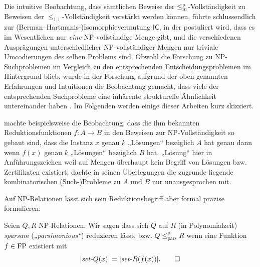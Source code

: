 Die intuitive Beobachtung, dass sämtlichen Beweise der $\leq_\mathrm{m}^\mathrm{p}$-Vollständigkeit zu Beweisen der $\leq_\mathrm{1,i}$-Vollständigkeit verstärkt werden können, führte schlussendlich zur (Berman--Hartmanis-\nolinebreak)\linebreak[1]Isomorphievermutung $\mathsf{IC}$, in der postuliert wird, dass es im Wesentlichen nur \emph{eine} NP-vollständige Menge gibt, und die verschiedenen Ausprägungen unterschiedlicher NP-vollständiger Mengen nur triviale Umcodierungen des selben Problems sind.
Obwohl die Forschung zu NP-Suchproblemen im Vergleich zu den entsprechenden Entscheidungsproblemen im Hintergrund blieb, wurde in der Forschung aufgrund der oben genannten Erfahrungen und Intuitionen die Beobachtung gemacht, dass viele der entsprechenden Suchprobleme eine inhärente strukturelle Ähnlichkeit untereinander haben \parencite[vgl. auch die Diskussion von][]{hemaspaandra_take-home_1998}.
Im Folgenden werden einige dieser Arbeiten kurz skizziert.

\textcite[83]{simon_central_1975} machte beispielsweise die Beobachtung, dass die ihm bekannten Reduktionsfunktionen $f\colon A\to B$ in den Beweisen zur NP-Vollständigkeit so gebaut sind, dass die Instanz $x$ genau $k$ „Lösungen“ bezüglich $A$ hat genau dann wenn $f(x)$ genau $k$ „Lösungen“ bezüglich $B$ hat. „Lösung“ hier in Anführungszeichen weil auf Mengen überhaupt kein Begriff von Lösungen bzw. Zertifikaten existiert; \citeauthor{simon_central_1975} dachte in seinen Überlegungen die zugrunde liegende kombinatorischen (Such-)Probleme zu $A$ und $B$ nur unausgesprochen mit.

Auf NP-Relationen lässt sich sein Reduktionsbegriff aber formal präzise formulieren:
\begin{definition}
    Seien $Q, R$ NP-Relationen. Wir sagen dass sich $Q$ auf $R$ (in Polynomialzeit) \emph{sparsam} (\emph{„parsimonious“}) reduzieren lässt, bzw. $Q\leq_\mathrm{pars}^\mathrm p R$ wenn eine Funktion $f\in\mathrm{FP}$ existiert mit%
    \[ |\mathit{set}\text{-}{}Q(x)|=|\mathit{set}\text{-}{}R(f(x))|. \qedhere \]
\end{definition}

